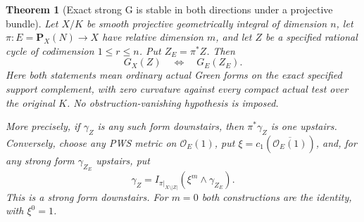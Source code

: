 \documentclass[11pt,a4paper]{article}
\newtheorem{theorem}{Theorem}[section]
\theoremstyle{definition}
\theoremstyle{remark}
\numberwithin{equation}{section}
\begin{document}
\begin{theorem}[Exact strong G is stable in both directions under a projective bundle]
\label{r16pg:strong-G}
Let $X/K$ be smooth projective geometrically integral of dimension
$n$, let $\pi:E=\mathbf P_X(N)\to X$ have relative dimension $m$,
and let $Z$ be a specified rational cycle of codimension
$1\leq r\leq n$. Put $Z_E=\pi^*Z$. Then
\[
                         G_X(Z)\quad\Longleftrightarrow\quad G_E(Z_E).
 \tag{PG16.5}\label{r16pg:G-equivalence}
\]
Here both statements mean ordinary actual Green forms on the exact
specified support complement, with zero curvature against every
compact actual test over the original $K$. No obstruction-vanishing
hypothesis is imposed.

More precisely, if $\gamma_Z$ is any such form downstairs, then
$\pi^*\gamma_Z$ is one upstairs. Conversely, choose any PWS metric
on $\mathcal O_E(1)$, put $\xi=c_1(\overline{\mathcal O_E(1)})$,
and, for any strong form $\gamma_{Z_E}$ upstairs, put
\[
      \gamma_Z=I_{\pi|_{X\setminus|Z|}}
                         (\xi^m\wedge\gamma_{Z_E}).
 \tag{PG16.6}\label{r16pg:descent-G}
\]
This is a strong form downstairs. For $m=0$ both constructions are
the identity, with $\xi^0=1$.
\end{theorem}
\end{document}
